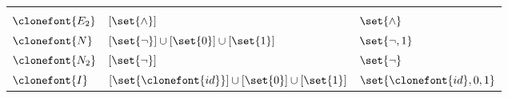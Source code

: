 \documentclass[11pt]{article}
\begin{document}
\begin{figure}[hbtp]
\begin{small}
\begin{longtable}[]{p{}p{}p{}}
\begin{minipage}[t]{0.38\columnwidth}
            \end{minipage}\tabularnewline
            \begin{minipage}[t]{0.12\columnwidth}\raggedright
                \(\clonefont{E_2}\)\strut
            \end{minipage} & \begin{minipage}[t]{0.41\columnwidth}\raggedright
                \([\set{\land}]\)\strut
            \end{minipage} & \begin{minipage}[t]{0.38\columnwidth}\raggedright
                \(\set{\land}\)\strut
            \end{minipage}\tabularnewline
            \begin{minipage}[t]{0.12\columnwidth}\raggedright
                \(\clonefont{N}\)\strut
            \end{minipage} & \begin{minipage}[t]{0.41\columnwidth}\raggedright
                \([\set{\neg}] \cup [\set{0}] \cup [\set{1}]\)\strut
            \end{minipage} & \begin{minipage}[t]{0.38\columnwidth}\raggedright
                \(\set{\neg, 1}\)\strut
            \end{minipage}\tabularnewline
            \begin{minipage}[t]{0.12\columnwidth}\raggedright
                \(\clonefont{N_2}\)\strut
            \end{minipage} & \begin{minipage}[t]{0.41\columnwidth}\raggedright
                \([\set{\neg}]\)\strut
            \end{minipage} & \begin{minipage}[t]{0.38\columnwidth}\raggedright
                \(\set{\neg}\)\strut
            \end{minipage}\tabularnewline
            \begin{minipage}[t]{0.12\columnwidth}\raggedright
                \(\clonefont{I}\)\strut
            \end{minipage} & \begin{minipage}[t]{0.41\columnwidth}\raggedright
                \([\set{\clonefont{id}}] \cup [\set{0}] \cup [\set{1}]\)\strut
            \end{minipage} & \begin{minipage}[t]{0.38\columnwidth}\raggedright
                \(\set{\clonefont{id}, 0, 1}\)\strut
            \end{minipage}\tabularnewline

\end{longtable}
\end{small}
\end{figure}
\end{document}
